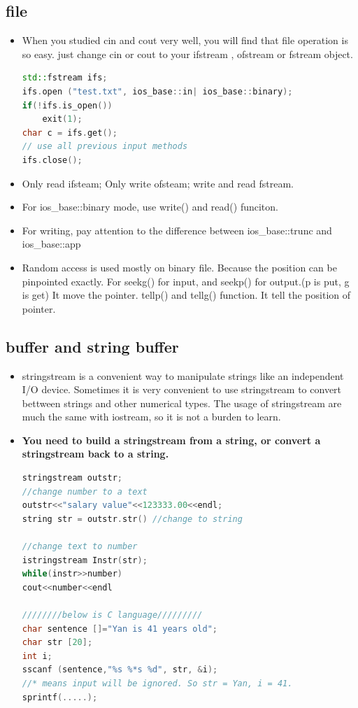 \documentclass[a4paper,12pt,twoside]{book}
\begin{document}
\subsection{file}
\begin{itemize}
	\item When you studied cin and cout very well, you will find that file operation is so easy. just change cin or cout to your ifstream , ofstream or fstream object.
	
\begin{lstlisting}[frame=single, language=c++]
std::fstream ifs;
ifs.open ("test.txt", ios_base::in| ios_base::binary);
if(!ifs.is_open())
	exit(1);
char c = ifs.get();
// use all previous input methods
ifs.close();
\end{lstlisting}
	\item Only read ifsteam;  Only write ofsteam; write and read fstream.
	
	\item For ios\_base::binary mode, use write() and read() funciton.
	
	\item For writing, pay attention to the difference between ios\_base::trunc and ios\_base::app
	
	\item Random access is used mostly on binary file. Because the position can be pinpointed exactly. For seekg() for input, and seekp() for output.(p is put, g is get) It move the pointer. tellp() and tellg() function.  It tell the position of pointer.
	
\end{itemize}

\subsection{buffer and string buffer}

\begin{itemize}
	\item stringstream is a convenient way to manipulate strings like an independent I/O device. Sometimes it is very convenient to use stringstream to convert bettween strings and other numerical types. The usage of stringstream are much the same with iostream, so it is not a burden to learn.  
	
	\item \textbf{You need to build a stringstream from a string, or convert a stringstream back to a string.}
	
\begin{lstlisting}[frame=single, language=c++]
stringstream outstr;
//change number to a text
outstr<<"salary value"<<123333.00<<endl;
string str = outstr.str() //change to string
	
//change text to number
istringstream Instr(str);
while(instr>>number)
cout<<number<<endl

////////below is C language/////////
char sentence []="Yan is 41 years old";
char str [20];
int i;
sscanf (sentence,"%s %*s %d", str, &i);
//* means input will be ignored. So str = Yan, i = 41.
sprintf(.....);
\end{lstlisting}
	
\end{itemize}
\end{document}
